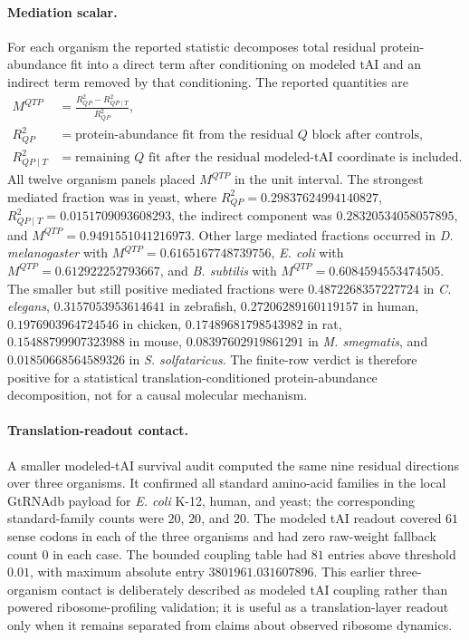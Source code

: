 \paragraph{Mediation scalar.}
For each organism the reported statistic decomposes total residual protein-abundance fit into a direct term after conditioning on modeled tAI and an indirect term removed by that conditioning.  The reported quantities are
$$
\begin{aligned}
M^{QTP} &= \frac{R^2_{QP}-R^2_{QP\mid T}}{R^2_{QP}},\\
R^2_{QP} &= \text{protein-abundance fit from the residual } Q \text{ block after controls},\\
R^2_{QP\mid T} &= \text{remaining } Q \text{ fit after the residual modeled-tAI coordinate is included}.
\end{aligned}
$$
All twelve organism panels placed $M^{QTP}$ in the unit interval.  The strongest mediated fraction was in yeast, where $R^2_{QP}=0.29837624994140827$, $R^2_{QP\mid T}=0.0151709093608293$, the indirect component was $0.28320534058057895$, and $M^{QTP}=0.9491551041216973$.  Other large mediated fractions occurred in \textit{D. melanogaster} with $M^{QTP}=0.6165167748739756$, \textit{E. coli} with $M^{QTP}=0.612922252793667$, and \textit{B. subtilis} with $M^{QTP}=0.6084594553474505$.  The smaller but still positive mediated fractions were $0.4872268357227724$ in \textit{C. elegans}, $0.3157053953614641$ in zebrafish, $0.27206289160119157$ in human, $0.1976903964724546$ in chicken, $0.17489681798543982$ in rat, $0.15488799907323988$ in mouse, $0.08397602919861291$ in \textit{M. smegmatis}, and $0.01850668564589326$ in \textit{S. solfataricus}.  The finite-row verdict is therefore positive for a statistical translation-conditioned protein-abundance decomposition, not for a causal molecular mechanism.

\paragraph{Translation-readout contact.}
A smaller modeled-tAI survival audit computed the same nine residual directions over three organisms.  It confirmed all standard amino-acid families in the local GtRNAdb payload for \textit{E. coli} K-12, human, and yeast; the corresponding standard-family counts were $20$, $20$, and $20$.  The modeled tAI readout covered $61$ sense codons in each of the three organisms and had zero raw-weight fallback count $0$ in each case.  The bounded coupling table had $81$ entries above threshold $0.01$, with maximum absolute entry $3801961.031607896$.  This earlier three-organism contact is deliberately described as modeled tAI coupling rather than powered ribosome-profiling validation; it is useful as a translation-layer readout only when it remains separated from claims about observed ribosome dynamics.

